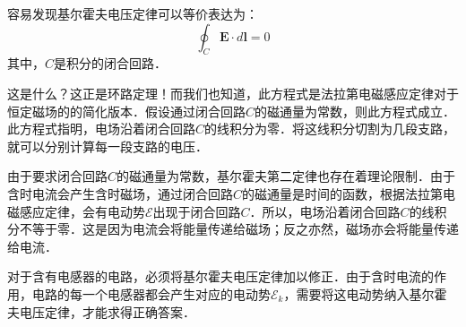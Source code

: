 容易发现基尔霍夫电压定律可以等价表达为：
\begin{equation}
\oint _{{C} }\mathbf {E} \cdot d\mathbf {l} =0
\end{equation}
其中，${C}$是积分的闭合回路．

这是什么？这正是环路定理！而我们也知道，此方程式是法拉第电磁感应定律对于恒定磁场的的简化版本．假设通过闭合回路${C}$的磁通量为常数，则此方程式成立．此方程式指明，电场沿着闭合回路${C}$的线积分为零．将这线积分切割为几段支路，就可以分别计算每一段支路的电压．

由于要求闭合回路${C}$的磁通量为常数，基尔霍夫第二定律也存在着理论限制．由于含时电流会产生含时磁场，通过闭合回路${C}$的磁通量是时间的函数，根据法拉第电磁感应定律，会有电动势$\mathcal{E}$出现于闭合回路${C}$．所以，电场沿着闭合回路${C}$的线积分不等于零．这是因为电流会将能量传递给磁场；反之亦然，磁场亦会将能量传递给电流．

对于含有电感器的电路，必须将基尔霍夫电压定律加以修正．由于含时电流的作用，电路的每一个电感器都会产生对应的电动势$\mathcal{E}_k$，需要将这电动势纳入基尔霍夫电压定律，才能求得正确答案．
